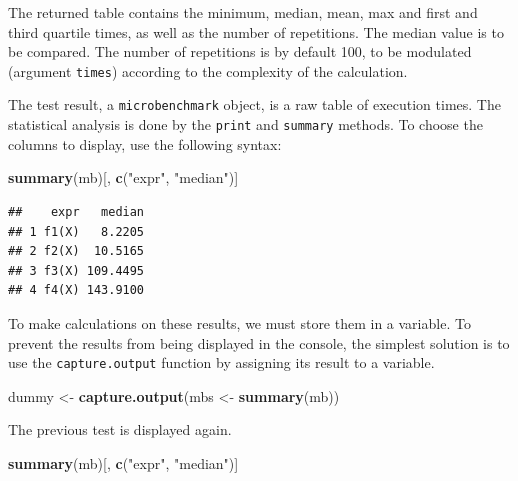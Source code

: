 \documentclass[
  12pt,
  american,
  a4paper,
  extrafontsizes,onecolumn,openright
  ]{memoir}
\newenvironment{Shaded}{\begin{snugshade}}{\end{snugshade}}
\newcommand{\FunctionTok}[1]{\textcolor[rgb]{0.13,0.29,0.53}{\textbf{#1}}}
\newcommand{\NormalTok}[1]{#1}
\newcommand{\OtherTok}[1]{\textcolor[rgb]{0.56,0.35,0.01}{#1}}
\newcommand{\StringTok}[1]{\textcolor[rgb]{0.31,0.60,0.02}{#1}}
\begin{document}
\normalsize

The returned table contains the minimum, median, mean, max and first and third quartile times, as well as the number of repetitions.
The median value is to be compared.
The number of repetitions is by default 100, to be modulated (argument \texttt{times}) according to the complexity of the calculation.

The test result, a \texttt{microbenchmark} object, is a raw table of execution times.
The statistical analysis is done by the \texttt{print} and \texttt{summary} methods.
To choose the columns to display, use the following syntax:

\scriptsize

\begin{Shaded}
\begin{Highlighting}[]
\FunctionTok{summary}\NormalTok{(mb)[, }\FunctionTok{c}\NormalTok{(}\StringTok{"expr"}\NormalTok{, }\StringTok{"median"}\NormalTok{)]}
\end{Highlighting}
\end{Shaded}

\begin{verbatim}
##    expr   median
## 1 f1(X)   8.2205
## 2 f2(X)  10.5165
## 3 f3(X) 109.4495
## 4 f4(X) 143.9100
\end{verbatim}

\normalsize

To make calculations on these results, we must store them in a variable.
To prevent the results from being displayed in the console, the simplest solution is to use the \texttt{capture.output} function by assigning its result to a variable.

\scriptsize

\begin{Shaded}
\begin{Highlighting}[]
\NormalTok{dummy }\OtherTok{\textless{}{-}} \FunctionTok{capture.output}\NormalTok{(mbs }\OtherTok{\textless{}{-}} \FunctionTok{summary}\NormalTok{(mb))}
\end{Highlighting}
\end{Shaded}

\normalsize

The previous test is displayed again.

\scriptsize

\begin{Shaded}
\begin{Highlighting}[]
\FunctionTok{summary}\NormalTok{(mb)[, }\FunctionTok{c}\NormalTok{(}\StringTok{"expr"}\NormalTok{, }\StringTok{"median"}\NormalTok{)]}
\end{Highlighting}
\end{Shaded}
\end{document}
